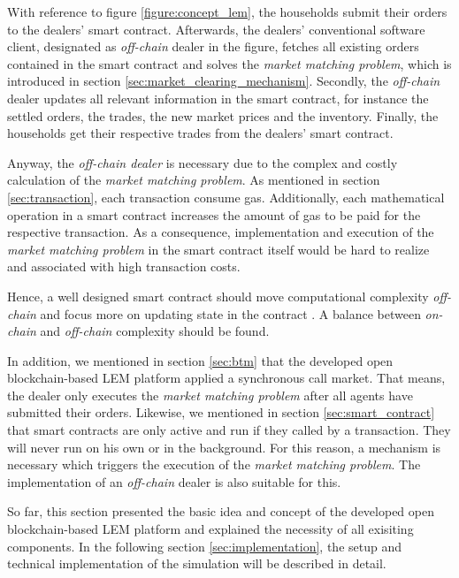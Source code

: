 With reference to figure \ref{figure:concept_lem}, the households submit their orders to the dealers' smart contract.  
Afterwards, the dealers' conventional software client, designated as \textit{off-chain} dealer in the figure, fetches all existing orders contained in the smart contract
and solves the \textit{market matching problem}, which is introduced in section \ref{sec:market_clearing_mechanism}.
Secondly, the \textit{off-chain} dealer updates all relevant information in the smart contract, for instance 
the settled orders, the trades, the new market prices and the inventory.
Finally, the households get their respective trades from the dealers' smart contract. 

Anyway, the \textit{off-chain dealer} is necessary due to the complex and costly calculation of the \textit{market matching problem}. 
As mentioned in section \ref{sec:transaction}, each transaction consume gas. Additionally, each mathematical operation in a smart contract
increases the amount of gas to be paid for the respective transaction. As a consequence, implementation and execution of the \textit{market matching problem}
in the smart contract itself would be hard to realize and associated with high transaction costs. 

Hence, a well designed smart contract should move computational complexity \textit{off-chain} 
and focus more on updating state in the contract . A balance between \textit{on-chain}
and \textit{off-chain} complexity should be found.

In addition, we mentioned in section \ref{sec:btm} that the developed open blockchain-based LEM platform applied a synchronous
call market. That means, the dealer only executes the \textit{market matching problem} after all agents have submitted their orders.
Likewise, we mentioned in section \ref{sec:smart_contract} that smart contracts are only active and run if they called by a transaction.
They will never run on his own or in the background. For this reason, a mechanism is necessary which triggers the execution of the 
\textit{market matching problem}. The implementation of an \textit{off-chain} dealer is also suitable for this.

So far, this section presented the basic idea and concept of the developed open blockchain-based LEM platform
and explained the necessity of all exisiting components. In the following section \ref{sec:implementation}, the setup 
and technical implementation of the simulation will be described in detail. 


